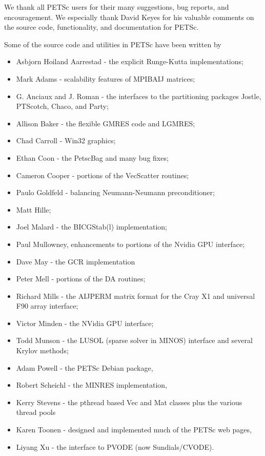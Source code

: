 %
%

\medskip \medskip \noindent
We thank all PETSc users for their many suggestions, bug reports, and
encouragement.  We especially thank David Keyes
for his valuable comments on the source code,
functionality, and documentation for PETSc.


\vspace{.3in}
\noindent
Some of the source code and utilities in PETSc
have been written by 
\begin{itemize}
  \item Asbjorn Hoiland Aarrestad - the explicit Runge-Kutta implementations;
  \item Mark Adams - scalability features of MPIBAIJ matrices;
  \item G. Anciaux and J. Roman - the interfaces to the partitioning packages Jostle, PTScotch, Chaco, and Party;
  \item Allison Baker - the flexible GMRES code and LGMRES;
  \item Chad Carroll - Win32 graphics;
  \item Ethan Coon - the PetscBag and many bug fixes;
  \item Cameron Cooper - portions of the VecScatter routines;
  \item Paulo Goldfeld - balancing Neumann-Neumann preconditioner;
  \item Matt Hille;
  \item Joel Malard - the BICGStab(l) implementation;
  \item Paul Mullowney, enhancements to portions of the Nvidia GPU interface;
  \item Dave May - the GCR implementation
  \item Peter Mell - portions of the DA routines;
  \item Richard Mills - the AIJPERM matrix format for the Cray X1 and universal F90 array interface;
  \item Victor Minden - the NVidia GPU interface;
  \item Todd Munson - the LUSOL (sparse solver in MINOS) interface and several Krylov methods;
  \item Adam Powell - the PETSc Debian package, 
  \item Robert Scheichl - the MINRES implementation,
  \item Kerry Stevens - the pthread based Vec and Mat classes plus the various thread pools
  \item Karen Toonen - designed and implemented much of the PETSc web pages,
  \item Liyang Xu - the interface to PVODE (now Sundials/CVODE).
\end{itemize}

